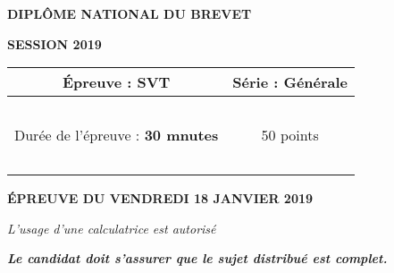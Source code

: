 \begin{center}
	
	{\scshape\LARGE \textbf{DIPLÔME NATIONAL DU BREVET} \par}
	\vspace{1cm}
	{\scshape\Large \textbf{SESSION 2019}\par}
	\vspace{1.5cm}
	

	\begin{large}
		\begin{tabular}{|@{\ }c@{\ }|@{\ }c@{\ }|}
		\hline
		\'Epreuve : \textbf{SVT} & Série : \textbf{Générale} \\ \hline
		\ & \ \\
		Durée de l'épreuve : \textbf{30 mnutes} & 50 points \\ 
		\ & \ \\
		\hline
	\end{tabular}
	\end{large}
		
	\vspace{1cm}
	{\large\bfseries \'EPREUVE DU VENDREDI 18 JANVIER 2019}
	
	\vspace{2cm}
	{\itshape L'usage d'une calculatrice est autorisé\par}
	\vspace{2.5cm}
	
	
	\vspace{0.5cm}
	{\bfseries\itshape Le candidat doit s'assurer que le sujet distribué est complet. }
	
	
%			
	

\end{center}
\newpage